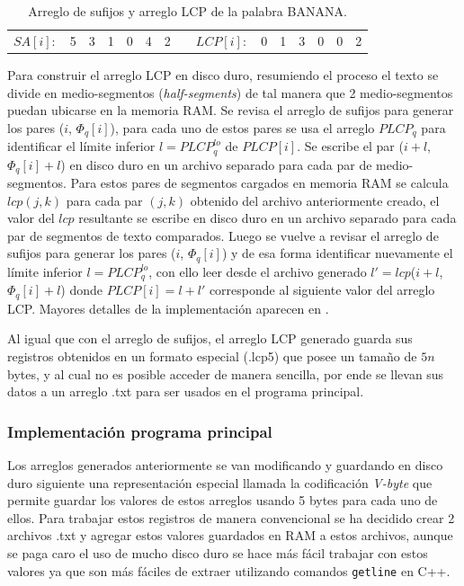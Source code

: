 \begin{table}[!htb]
\centering
\begin{tabular}{c|c|c|c|c|c|c|cc|c|c|c|c|c|c|}
\cline{2-7} \cline{10-15}
$SA[i]:$ & 5 & 3 & 1 & 0 & 4 & 2 &  & $LCP[i]:$ & 0 & 1 & 3 & 0 & 0 & 2 \\ \cline{2-7} \cline{10-15} 
\end{tabular}
\caption{Arreglo de sufijos y arreglo LCP de la palabra BANANA.}
\end{table}

Para construir el arreglo LCP en disco duro, resumiendo el proceso el texto se divide en medio-segmentos (\textit{half-segments}) de tal manera que 2 medio-segmentos puedan ubicarse en la memoria RAM. Se revisa el arreglo de sufijos para generar los pares ($i$, $\Phi_{q}[i]$), para cada uno de estos pares se usa el arreglo $PLCP_{q}$ para identificar el límite inferior $l = PLCP_{q}^{lo}$ de $PLCP[i]$. Se escribe el par ($i + l$, $\Phi_{q}[i] + l$) en disco duro en un archivo separado para cada par de medio-segmentos. Para estos pares de segmentos cargados en memoria RAM se calcula $lcp(j,k)$ para cada par $(j,k)$ obtenido del archivo anteriormente creado, el valor del $lcp$ resultante se escribe en disco duro en un archivo separado para cada par de segmentos de texto comparados. Luego se vuelve a revisar el arreglo de sufijos para generar los pares ($i$, $\Phi_{q}[i]$) y de esa forma identificar nuevamente el límite inferior $l = PLCP_{q}^{lo}$, con ello leer desde el archivo generado $l'=lcp$($i + l$, $\Phi_{q}[i] + l$) donde $PLCP[i] = l + l'$ corresponde al siguiente valor del arreglo LCP. Mayores detalles de la implementación aparecen en \cite{emsparse2}.

Al igual que con el arreglo de sufijos, el arreglo LCP generado guarda sus registros obtenidos en un formato especial (.lcp5) que posee un tamaño de $5n$ bytes, y al cual no es posible acceder de manera sencilla, por ende se llevan sus datos a un arreglo .txt para ser usados en el programa principal.

\subsubsection{Implementación programa principal}

Los arreglos generados anteriormente se van modificando y guardando en disco duro siguiente una representación especial llamada la codificación \textit{V-byte} \cite{vbyte} que permite guardar los valores de estos arreglos usando 5 bytes para cada uno de ellos. Para trabajar estos registros de manera convencional se ha decidido crear 2 archivos .txt y agregar estos valores guardados en RAM a estos archivos, aunque se paga caro el uso de mucho disco duro se hace más fácil trabajar con estos valores ya que son más fáciles de extraer utilizando comandos \texttt{getline} en C++.

